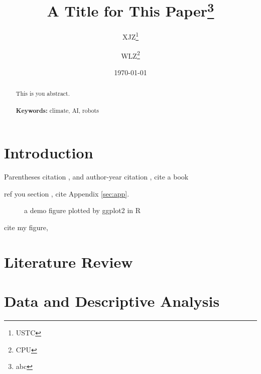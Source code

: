 \documentclass[a4paper, 12pt]{article}
\begin{document}
\begin{titlepage}
    \title{A Title for This Paper\thanks{abc}}
    \author{XJZ\thanks{USTC} \and WLZ\thanks{CPU}}
    \date{\today}
    \maketitle
    \begin{abstract}
        \noindent
        This is you abstract.
        \\
        \vspace{0in}\\
        \noindent\textbf{Keywords:} climate, AI, robots\\
        \bigskip
    \end{abstract}
    \setcounter{page}{0}
    \thispagestyle{empty}
\end{titlepage}
\pagebreak \newpage
\doublespacing

\section{Introduction}\label{sec:intro}
Parentheses citation \citep{DunningHuchetteLubin2017}, and author-year citation \citet{DunningHuchetteLubin2017}, cite a book \citep[\S 2.1.1]{DunningHuchetteLubin2017}

ref you section , cite Appendix \ref{sec:app}.
\begin{figure}[!htbp]
    \centering
    
    \caption{a demo figure plotted by ggplot2 in R}
    \label{fig:demo}
\end{figure}
cite my figure, 

\begin{figure}[!htbp]
    \centering
    
\end{figure}


\section{Literature Review}
\section{Data and Descriptive Analysis}
\end{document}
